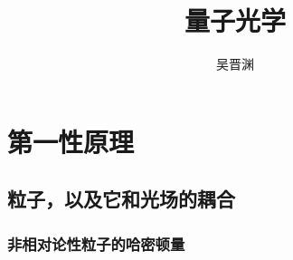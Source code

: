 \documentclass[UTF8, a4paper]{ctexart}
\title{量子光学}
\author{吴晋渊}
\begin{document}
\maketitle

\section{第一性原理}

\subsection{粒子，以及它和光场的耦合}

\subsubsection{非相对论性粒子的哈密顿量}
\end{document}
